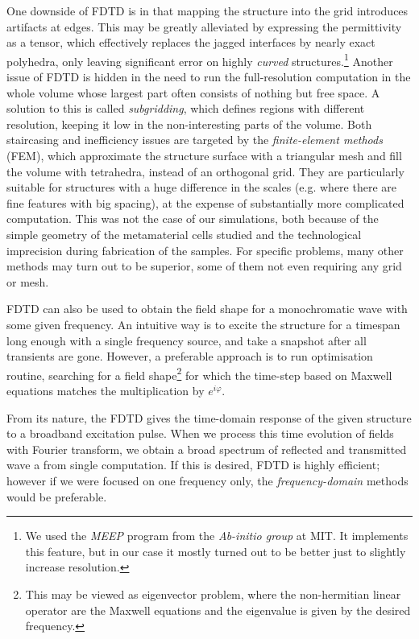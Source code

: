 \documentclass[letterpaper,12pt]{report}
\begin{document}
One downside of FDTD is in that mapping the structure into the grid introduces artifacts at edges. This may be greatly alleviated by expressing the permittivity as a tensor\cite{oskooi2009subpixel}, which effectively replaces the jagged interfaces by nearly exact polyhedra, only leaving significant error on highly \textit{curved} structures.\footnote{We used the \textit{MEEP}\cite{oskooi2010meep} program from the \textit{Ab-initio group} at MIT. It implements this feature, but in our case it mostly turned out to be better just to slightly increase resolution.}
Another issue of FDTD is hidden in the need to run the full-resolution computation in the whole volume whose largest part often consists of nothing but free space. A solution to this is called \textit{subgridding}\cite{zivanovic1991subgridding}, which defines regions with different resolution, keeping it low in the non-interesting parts of the volume. 
Both staircasing and inefficiency issues are targeted by the \textit{finite-element methods} (FEM), which approximate the structure surface with a triangular mesh and fill the volume with tetrahedra, instead of an orthogonal grid. They are particularly suitable for structures with a huge difference in the scales (e.g. where there are fine features with big spacing), at the expense of substantially more complicated computation. This was not the case of our simulations, both because of the simple geometry of the metamaterial cells studied and the technological imprecision during fabrication of the samples. For specific problems, many other methods may turn out to be superior, some of them not even requiring any grid or mesh.

FDTD can also be used to obtain the field shape for a monochromatic wave with some given frequency. An intuitive way is to excite the structure for a timespan long enough with a single frequency source, and take a snapshot after all transients are gone. However, a preferable approach is to run optimisation routine, searching for a field shape\footnote{This may be viewed as eigenvector problem, where the non-hermitian linear operator are the Maxwell equations and the eigenvalue is given by the desired frequency.} for which the time-step based on Maxwell equations matches the multiplication by $e^{i\varphi}$.

From its nature, the FDTD gives the time-domain response of the given structure to a broadband excitation pulse. When we process this time evolution of fields with Fourier transform, we obtain a broad spectrum of reflected and transmitted wave a from single computation. If this is desired, FDTD is highly efficient; however if we were focused on one frequency only, the \textit{frequency-domain} methods would be preferable. 
\end{document}
